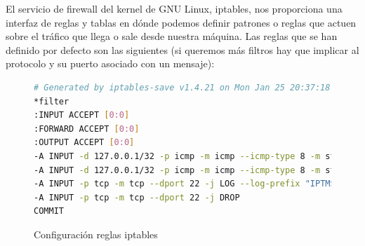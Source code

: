 El servicio de firewall del kernel de GNU Linux, iptables, nos proporciona una interfaz de reglas y tablas en dónde podemos definir patrones o reglas que actuen sobre el tráfico que llega o sale desde nuestra máquina. Las reglas que se han definido por defecto son las siguientes (si queremos más filtros hay que implicar al protocolo y su puerto asociado con un mensaje):

\begin{figure}[H]
\begin{lstlisting}[language=bash]
# Generated by iptables-save v1.4.21 on Mon Jan 25 20:37:18 2016
*filter
:INPUT ACCEPT [0:0]
:FORWARD ACCEPT [0:0]
:OUTPUT ACCEPT [0:0]
-A INPUT -d 127.0.0.1/32 -p icmp -m icmp --icmp-type 8 -m state --state NEW,RELATED,ESTABLISHED -j LOG --log-prefix "IPTMSG=Connection ICMP "
-A INPUT -d 127.0.0.1/32 -p icmp -m icmp --icmp-type 8 -m state --state NEW,RELATED,ESTABLISHED -j DROP
-A INPUT -p tcp -m tcp --dport 22 -j LOG --log-prefix "IPTMSG=Connection SSH "
-A INPUT -p tcp -m tcp --dport 22 -j DROP
COMMIT
\end{lstlisting}
\caption{Configuración reglas iptables}
\end{figure}

